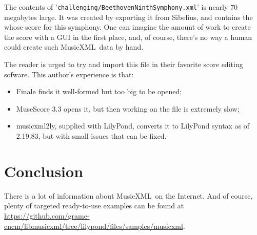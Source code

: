 \documentclass[12pt,a4paper]{article}
\newcommand{\mxml}{MusicXML}
\begin{document}
The contents of {'\tt challenging/BeethovenNinthSymphony.xml}' is nearly 70 megabytes large. It was created by exporting it from Sibelius\texttrademark, and contains the whose score for this symphony. One can imagine the amount of work to create the score with a GUI in the first place, and, of course, there's no way a human could create such \mxml\ data by hand.

The reader is urged to try and import this file in their favorite score editing sofware. This author's experience is that:

\begin{itemize}
\item Finale finds it well-formed but too big to be opened;
\item MuseScore 3.3 opens it, but then working on the file is extremely slow;
\item musicxml2ly, supplied with LilyPond, converts it to LilyPond syntax as of 2.19.83, but with small issues that can be fixed.
\end{itemize}

\section{Conclusion}

There is a lot of information about \mxml\ on the Internet. And of course, plenty of targeted ready-to-use examples can be found at \url{https://github.com/grame-cncm/libmusicxml/tree/lilypond/files/samples/musicxml}.

\lstlistoflistings


\tableofcontents

\end{document}
